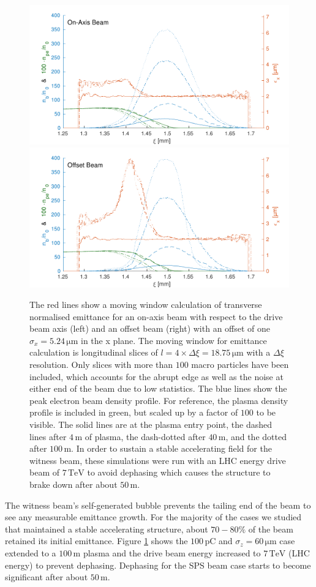 \documentclass[aps,prstab,reprint,amsmath,amssymb,groupedaddress]{revtex4-1}
\newcommand{\unit}[1]{\,\mathrm{#1}}
\begin{document}

\begin{figure}[hbt]
    \includegraphics[width=0.495\linewidth,trim={2mm 0mm 2mm 0mm},clip]{figures/beamEmittance}
    \includegraphics[width=0.495\linewidth,trim={2mm 0mm 2mm 0mm},clip]{figures/beamEmittanceOffset}
    \caption{\label{Fig:BeamEmitt} The red lines show a moving window calculation of transverse normalised emittance for
        an on-axis beam with respect to the drive beam axis (left) and an offset beam (right) with an offset of one
        $\sigma_{x} = 5.24\unit{\mu m}$ in the x plane. The moving window for emittance calculation is longitudinal
        slices of $l = 4\times\Delta\xi = 18.75\unit{\mu m}$ with a $\Delta\xi$ resolution. Only slices with more than
        $100$ macro particles have been included, which accounts for the abrupt edge as well as the noise at either end
        of the beam due to low statistics. The blue lines show the peak electron beam density profile. For reference,
        the plasma density profile is included in green, but scaled up by a factor of $100$ to be visible. The solid
        lines are at the plasma entry point, the dashed lines after $4\unit{m}$ of plasma, the dash-dotted after
        $40\unit{m}$, and the dotted after $100\unit{m}$. In order to sustain a stable accelerating field for the
        witness beam, these simulations were run with an LHC energy drive beam of $7\unit{TeV}$ to avoid dephasing which
        causes the structure to brake down after about $50\unit{m}$.}
\end{figure}

The witness beam's self-generated bubble prevents the tailing end of the beam to see any measurable emittance growth.
For the majority of the cases we studied that maintained a stable accelerating structure, about $70-80\%$ of the beam
retained its initial emittance. Figure \ref{Fig:BeamEmitt} shows the $100\unit{pC}$ and $\sigma_{z} = 60\unit{\mu m}$
case extended to a $100\unit{m}$ plasma and the drive beam energy increased to $7\unit{TeV}$ (LHC energy) to prevent
dephasing. Dephasing for the SPS beam case starts to become significant after about $50\unit{m}$.
\end{document}
